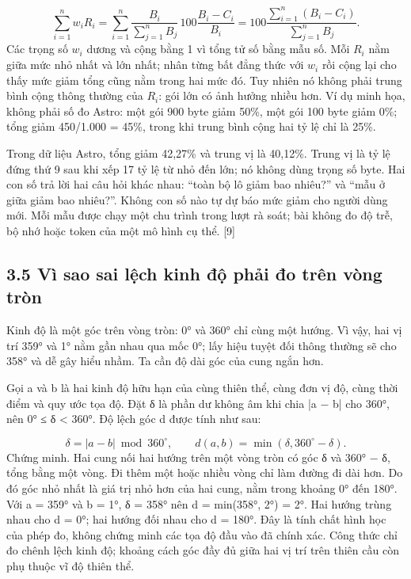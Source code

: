 \documentclass[11pt,a4paper]{article}
\begin{document}
\begin{equation}\sum_{i=1}^{n}w_iR_i=\sum_{i=1}^{n}\frac{B_i}{\sum_{j=1}^{n}B_j}\,100\frac{B_i-C_i}{B_i}=100\frac{\sum_{i=1}^{n}(B_i-C_i)}{\sum_{j=1}^{n}B_j}.\label{eq:WEIGHTED_PROOF}\end{equation}
Các trọng số \(w_{i}\) dương và cộng bằng 1 vì tổng tử số bằng mẫu số. Mỗi \(R_{i}\) nằm giữa mức nhỏ nhất và lớn nhất; nhân từng bất đẳng thức với \(w_{i}\) rồi cộng lại cho thấy mức giảm tổng cũng nằm trong hai mức đó. Tuy nhiên nó không phải trung bình cộng thông thường của \(R_{i}\): gói lớn có ảnh hưởng nhiều hơn. Ví dụ minh họa, không phải số đo Astro: một gói 900 byte giảm 50\%, một gói 100 byte giảm 0\%; tổng giảm 450/\allowbreak{}1.000 = 45\%, trong khi trung bình cộng hai tỷ lệ chỉ là 25\%.


Trong dữ liệu Astro, tổng giảm 42,27\% và trung vị là 40,12\%. Trung vị là tỷ lệ đứng thứ 9 sau khi xếp 17 tỷ lệ từ nhỏ đến lớn; nó không dùng trọng số byte. Hai con số trả lời hai câu hỏi khác nhau: “toàn bộ lô giảm bao nhiêu?” và “mẫu ở giữa giảm bao nhiêu?”. Không con số nào tự dự báo mức giảm cho người dùng mới. Mỗi mẫu được chạy một chu trình trong lượt rà soát; bài không đo độ trễ, bộ nhớ hoặc token của một mô hình cụ thể. [9]


\subsection*{3.5 Vì sao sai lệch kinh độ phải đo trên vòng tròn}
Kinh độ là một góc trên vòng tròn: 0° và 360° chỉ cùng một hướng. Vì vậy, hai vị trí 359° và 1° nằm gần nhau qua mốc 0°; lấy hiệu tuyệt đối thông thường sẽ cho 358° và dễ gây hiểu nhầm. Ta cần độ dài góc của cung ngắn hơn.


Gọi a và b là hai kinh độ hữu hạn của cùng thiên thể, cùng đơn vị độ, cùng thời điểm và quy ước tọa độ. Đặt δ là phần dư không âm khi chia |a − b| cho 360°, nên 0° ≤ δ < 360°. Độ lệch góc d được tính như sau:


\begin{equation}\delta=|a-b|\bmod 360^\circ,\qquad d(a,b)=\min\!\left(\delta,360^\circ-\delta\right).\label{eq:ANGLE}\end{equation}
Chứng minh. Hai cung nối hai hướng trên một vòng tròn có góc δ và 360° − δ, tổng bằng một vòng. Đi thêm một hoặc nhiều vòng chỉ làm đường đi dài hơn. Do đó góc nhỏ nhất là giá trị nhỏ hơn của hai cung, nằm trong khoảng 0° đến 180°. Với a = 359° và b = 1°, δ = 358° nên d = min(358°, 2°) = 2°. Hai hướng trùng nhau cho d = 0°; hai hướng đối nhau cho d = 180°. Đây là tính chất hình học của phép đo, không chứng minh các tọa độ đầu vào đã chính xác. Công thức chỉ đo chênh lệch kinh độ; khoảng cách góc đầy đủ giữa hai vị trí trên thiên cầu còn phụ thuộc vĩ độ thiên thể.
\end{document}
